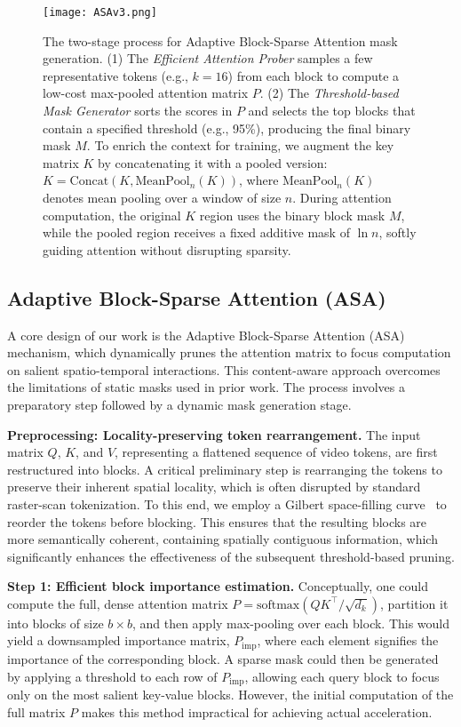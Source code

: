 \documentclass[letterpaper]{article} %
\begin{document}
\begin{figure*}[t]
\centering
\texttt{[image: ASAv3.png]} %
\caption{The two-stage process for Adaptive Block-Sparse Attention mask generation. (1) The \textit{Efficient Attention Prober} samples a few representative tokens (e.g., $k=16$) from each block to compute a low-cost max-pooled attention matrix $P$. (2) The \textit{Threshold-based Mask Generator} sorts the scores in $P$ and selects the top blocks that contain a specified threshold (e.g., 95\%), producing the final binary mask $M$. To enrich the context for training, we augment the key matrix \(K\) by concatenating it with a pooled version: \(K = \text{Concat}(K, \text{MeanPool}_n(K))\), where \(\text{MeanPool}_n(K)\) denotes mean pooling over a window of size \(n\). During attention computation, the original \(K\) region uses the binary block mask \(M\), while the pooled region receives a fixed additive mask of \(\ln n\), softly guiding attention without disrupting sparsity.
}

\label{fig:mask_generation}
\end{figure*}
\subsection{Adaptive Block-Sparse Attention (ASA)}
A core design of our work is the Adaptive Block-Sparse Attention (ASA) mechanism, which dynamically prunes the attention matrix to focus computation on salient spatio-temporal interactions. This content-aware approach overcomes the limitations of static masks used in prior work. The process involves a preparatory step followed by a dynamic mask generation stage.

\textbf{Preprocessing: Locality-preserving token rearrangement.}
The input matrix $Q$, $K$, and $V$, representing a flattened sequence of video tokens, are first restructured into blocks. A critical preliminary step is rearranging the tokens to preserve their inherent spatial locality, which is often disrupted by standard raster-scan tokenization. To this end, we employ a Gilbert space-filling curve~\cite{zhang2025spargeattentionaccuratetrainingfreesparse} to reorder the tokens before blocking. This ensures that the resulting blocks are more semantically coherent, containing spatially contiguous information, which significantly enhances the effectiveness of the subsequent threshold-based pruning.

\textbf{Step 1: Efficient block importance estimation.}
Conceptually, one could compute the full, dense attention matrix $P = \text{softmax}(QK^\top / \sqrt{d_k})$, partition it into blocks of size $b \times b$, and then apply max-pooling over each block. This would yield a downsampled importance matrix, $P_{\text{imp}}$, where each element signifies the importance of the corresponding block. A sparse mask could then be generated by applying a threshold to each row of $P_{\text{imp}}$, allowing each query block to focus only on the most salient key-value blocks. However, the initial computation of the full matrix $P$ makes this method impractical for achieving actual acceleration.
\end{document}

